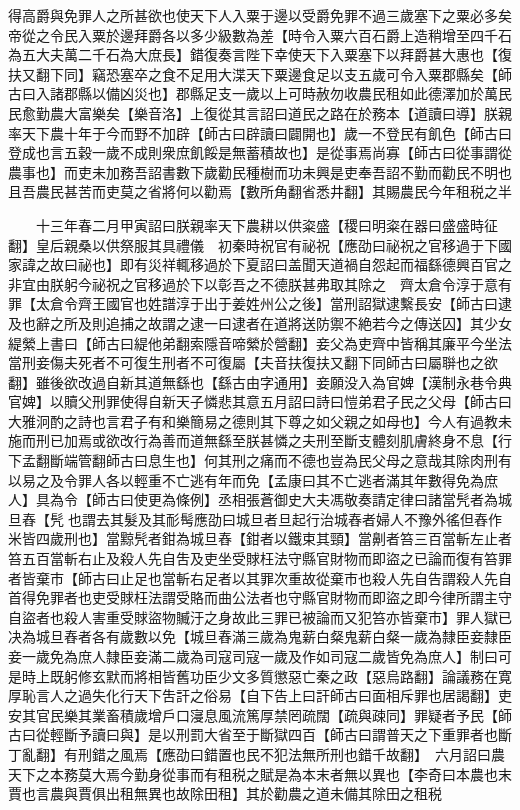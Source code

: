 得高爵與免罪人之所甚欲也使天下人入粟于邊以受爵免罪不過三歲塞下之粟必多矣帝從之令民入粟於邊拜爵各以多少級數為差【時令入粟六百石爵上造稍增至四千石為五大夫萬二千石為大庶長】錯復奏言陛下幸使天下入粟塞下以拜爵甚大惠也【復扶又翻下同】竊恐塞卒之食不足用大渫天下粟邊食足以支五歲可令入粟郡縣矣【師古曰入諸郡縣以備凶災也】郡縣足支一歲以上可時赦勿收農民租如此德澤加於萬民民愈勤農大富樂矣【樂音洛】上復從其言詔曰道民之路在於務本【道讀曰導】朕親率天下農十年于今而野不加辟【師古曰辟讀曰闢開也】歲一不登民有飢色【師古曰登成也言五穀一歲不成則衆庶飢餒是無蓄積故也】是從事焉尚寡【師古曰從事謂從農事也】而吏未加務吾詔書數下歲勸民種樹而功未興是吏奉吾詔不勤而勸民不明也且吾農民甚苦而吏莫之省將何以勸焉【數所角翻省悉井翻】其賜農民今年租税之半

　　十三年春二月甲寅詔曰朕親率天下農耕以供粢盛【稷曰明粢在器曰盛盛時征翻】皇后親桑以供祭服其具禮儀　初秦時祝官有祕祝【應劭曰祕祝之官移過于下國家諱之故曰祕也】即有災祥輒移過於下夏詔曰盖聞天道禍自怨起而福繇德興百官之非宜由朕躬今祕祝之官移過於下以彰吾之不德朕甚弗取其除之　齊太倉令淳于意有罪【太倉令齊王國官也姓譜淳于出于姜姓州公之後】當刑詔獄逮繫長安【師古曰逮及也辭之所及則追捕之故謂之逮一曰逮者在道將送防禦不絶若今之傳送囚】其少女緹縈上書曰【師古曰緹他弟翻索隱音啼縈於營翻】妾父為吏齊中皆稱其廉平今坐法當刑妾傷夫死者不可復生刑者不可復屬【夫音扶復扶又翻下同師古曰屬聨也之欲翻】雖後欲改過自新其道無繇也【繇古由字通用】妾願没入為官婢【漢制永巷令典官婢】以贖父刑罪使得自新天子憐悲其意五月詔曰詩曰愷弟君子民之父母【師古曰大雅泂酌之詩也言君子有和樂簡易之德則其下尊之如父親之如母也】今人有過教未施而刑已加焉或欲改行為善而道無繇至朕甚憐之夫刑至斷支體刻肌膚終身不息【行下孟翻斷端管翻師古曰息生也】何其刑之痛而不德也豈為民父母之意哉其除肉刑有以易之及令罪人各以輕重不亡逃有年而免【孟康曰其不亡逃者滿其年數得免為庶人】具為令【師古曰使更為條例】丞相張蒼御史大夫馮敬奏請定律曰諸當髠者為城旦舂【髠也謂去其髮及其耏髩應劭曰城旦者旦起行治城舂者婦人不豫外徭但舂作米皆四歲刑也】當黥髠者鉗為城旦舂【鉗者以鐵束其頸】當劓者笞三百當斬左止者笞五百當斬右止及殺人先自吿及吏坐受賕枉法守縣官財物而即盜之已論而復有笞罪者皆棄市【師古曰止足也當斬右足者以其罪次重故從棄市也殺人先自告謂殺人先自首得免罪者也吏受賕枉法謂受賂而曲公法者也守縣官財物而即盜之即今律所謂主守自盜者也殺人害重受賕盜物贓汙之身故此三罪已被論而又犯笞亦皆棄市】罪人獄已决為城旦舂者各有歲數以免【城旦舂滿三歲為鬼薪白粲鬼薪白粲一歲為隸臣妾隸臣妾一歲免為庶人隸臣妾滿二歲為司寇司寇一歲及作如司寇二歲皆免為庶人】制曰可是時上既躬修玄默而將相皆舊功臣少文多質懲惡亡秦之政【惡烏路翻】論議務在寛厚恥言人之過失化行天下吿訐之俗易【自下告上曰訐師古曰面相斥罪也居謁翻】吏安其官民樂其業畜積歲增戶口寖息風流篤厚禁罔疏闊【疏與疎同】罪疑者予民【師古曰從輕斷予讀曰與】是以刑罰大省至于斷獄四百【師古曰謂普天之下重罪者也斷丁亂翻】有刑錯之風焉【應劭曰錯置也民不犯法無所刑也錯千故翻】　六月詔曰農天下之本務莫大焉今勤身從事而有租税之賦是為本末者無以異也【李奇曰本農也末賈也言農與賈俱出租無異也故除田租】其於勸農之道未備其除田之租税

